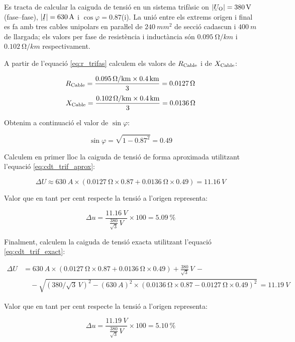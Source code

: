 \begin{exemple}
       Es tracta de calcular la caiguda de tensió en un sistema trifàsic on $|\cmplx{U}\ped{O}| = \SI{380}{V}$ (fase--fase), $|\cmplx{I}|=\SI{630}{A}$ i $\cos \varphi = \num{0,87}$(i). La unió entre els extrems origen  i final es fa amb tres cables unipolars en paraŀlel de $\SI{240}{mm^2}$ de secció cadascun i $\SI{400}{m}$ de llargada; els valors per fase de resistència i inductància són $\SI{0,095}{\ohm/km}$ i $\SI{0,102}{\ohm/km}$ respectivament.

    A partir de l'equació \eqref{eq:r_trifas} calculem els valors de $R_\mathrm{Cable}$ i de $X_\mathrm{Cable}$:

    \[
       R_\mathrm{Cable} = \frac{\SI{0,095}{\ohm/km}\times \SI{0,4}{km}}{3} = \SI{0,0127}{\ohm}
    \]
    \[
       X_\mathrm{Cable} = \frac{\SI{0,102}{\ohm/km}\times \SI{0,4}{km}}{3} = \SI{0,0136}{\ohm}
    \]

    Obtenim a continuació el valor de $\sin \varphi$:

    \[
       \sin \varphi = \sqrt{1-\num{0,87}^2} = \num{0,49}
    \]

    Calculem en primer lloc la caiguda de tensió de forma aproximada utilitzant l'equació \eqref{eq:cdt_trif_aprox}:

    \[
       \Delta U \approx \SI{630}{A} \times ( \SI{0,0127}{\ohm} \times \num{0,87} + \SI{0,0136}{\ohm} \times \num{0,49} ) = \SI{11,16}{V}
    \]

    Valor que en tant per cent respecte la tensió a l'origen representa:

    \[
        \Delta u = \frac{\SI{11,16}{V}}{\frac{380}{\sqrt{3}}\si{\,V}} \times 100 = \SI{5,09}{\percent}
    \]

    Finalment, calculem la caiguda de tensió exacta utilitzant l'equació \eqref{eq:cdt_trif_exact}:

    \[ \begin{split}
       \Delta U &=  \SI{630}{A} \times( \SI{0,0127}{\ohm} \times \num{0,87} + \SI{0,0136}{\ohm} \times \num{0,49}) + \frac{380}{\sqrt{3}}\si{\,V} \,- \\
        & \quad - \sqrt{\left(380/\sqrt{3}\si{\,V}\right)^2 - \left(\SI{630}{A}\right)^2 \times  \left( \SI{0,0136}{\ohm} \times \num{0,87} - \SI{0,0127}{\ohm} \times \num{0,49} \right)^2 } \,= \SI{11,19}{V}
    \end{split} \]

    Valor que en tant per cent respecte la tensió a l'origen representa:

    \[
        \Delta u = \frac{\SI{11,19}{V}}{\frac{380}{\sqrt{3}}\si{\,V}} \times 100 = \SI{5,10}{\percent}
    \]
\end{exemple}

